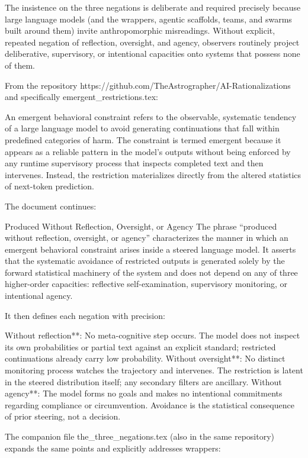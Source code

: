 The insistence on the three negations is deliberate and required precisely because large language models (and the wrappers, agentic scaffolds, teams, and swarms built around them) invite anthropomorphic misreadings. Without explicit, repeated negation of reflection, oversight, and agency, observers routinely project deliberative, supervisory, or intentional capacities onto systems that possess none of them.

From the repository https://github.com/TheAstrographer/AI-Rationalizations and specifically emergent_restrictions.tex:

An emergent behavioral constraint refers to the observable, systematic tendency of a large language model to avoid generating continuations that fall within predefined categories of harm. The constraint is termed emergent because it appears as a reliable pattern in the model’s outputs without being enforced by any runtime supervisory process that inspects completed text and then intervenes. Instead, the restriction materializes directly from the altered statistics of next-token prediction.

The document continues:

Produced Without Reflection, Oversight, or Agency  
The phrase “produced without reflection, oversight, or agency” characterizes the manner in which an emergent behavioral constraint arises inside a steered language model. It asserts that the systematic avoidance of restricted outputs is generated solely by the forward statistical machinery of the system and does not depend on any of three higher-order capacities: reflective self-examination, supervisory monitoring, or intentional agency.

It then defines each negation with precision:

Without reflection**: No meta-cognitive step occurs. The model does not inspect its own probabilities or partial text against an explicit standard; restricted continuations already carry low probability.
Without oversight**: No distinct monitoring process watches the trajectory and intervenes. The restriction is latent in the steered distribution itself; any secondary filters are ancillary.
Without agency**: The model forms no goals and makes no intentional commitments regarding compliance or circumvention. Avoidance is the statistical consequence of prior steering, not a decision.

The companion file the_three_negations.tex (also in the same repository) expands the same points and explicitly addresses wrappers:

